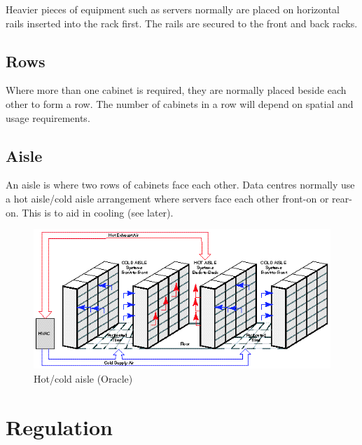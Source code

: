 Heavier pieces of equipment such as servers normally are placed on horizontal rails inserted into the rack first.
The rails are secured to the front and back racks.

\subsection{Rows}

Where more than one cabinet is required, they are normally placed beside each other to form a row.
The number of cabinets in a row will depend on spatial and usage requirements.

\subsection{Aisle}

An aisle is where two rows of cabinets face each other.
Data centres normally use a hot aisle/cold aisle arrangement where servers face each other front-on or rear-on.
This is to aid in cooling (see later).

\begin{figure}[htbp]
  \centering
  \includegraphics[width=1.0\linewidth]{hot_cold_aisle_oracle}
  \caption{Hot/cold aisle (Oracle)}
  \label{fig:hot-cold-aisle}
\end{figure}



\section{Regulation}

